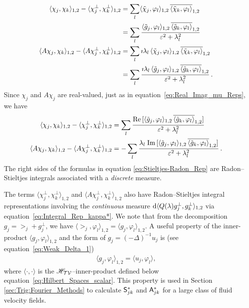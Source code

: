 \documentclass[amsa]{ipart}
\begin{document}
%
\begin{align}\label{eq:Stieltjes-Radon_Pre}
  \langle\chi_j,\chi_k\rangle_{1,2}-\langle\chi_j^\perp,\chi_k^\perp\rangle_{1,2}&=\sum_l\langle\chit_j,\varphi_l\rangle_{1,2}\,\overline{\langle\chit_k,\varphi_l\rangle}_{1,2}
         \\\notag
         &=\sum_l\frac{\langle\gt_j,\varphi_l\rangle_{1,2}\,\overline{\langle\gt_k,\varphi_l\rangle}_{1,2}}{\varepsilon^2+\lambda_l^2}
         \\\notag
  \langle A\chi_j,\chi_k\rangle_{1,2}-\langle A\chi_j^\perp,\chi_k^\perp\rangle_{1,2}&=\sum_l\imath\lambda_l\,\langle\chit_j,\varphi_l\rangle_{1,2}\,\overline{\langle\chit_k,\varphi_l\rangle}_{1,2}
         \\\notag
         &=\sum_l\frac{\imath\lambda_l\,\langle\gt_j,\varphi_l\rangle_{1,2}\,\overline{\langle\gt_k,\varphi_l\rangle}_{1,2}}{\varepsilon^2+\lambda_l^2}\,.
         \notag
\end{align}
%
Since $\chi_j$ and $A\chi_j$ are real-valued, just as in
equation~\eqref{eq:Real_Imag_mu_Reps}, we have 
%
\begin{align}\label{eq:Stieltjes-Radon_Rep}
  \langle\chi_j,\chi_k\rangle_{1,2}-\langle\chi_j^\perp,\chi_k^\perp\rangle_{1,2}
  &=\sum_l\frac{\Real[\langle\gt_j,\varphi_l\rangle_{1,2}\,\overline{\langle\gt_k,\varphi_l\rangle}_{1,2}]}{\varepsilon^2+\lambda_l^2}
         \\
  \langle A\chi_j,\chi_k\rangle_{1,2}-\langle A\chi_j^\perp,\chi_k^\perp\rangle_{1,2}
  &=-\sum_l\frac{\lambda_l\;\Imag[\langle\gt_j,\varphi_l\rangle_{1,2}\,\overline{\langle\gt_k,\varphi_l\rangle}_{1,2}]}{\varepsilon^2+\lambda_l^2}\,.
         \notag
\end{align}
%
The right sides of the formulas in equation
\eqref{eq:Stieltjes-Radon_Rep} are Radon--Stieltjes integrals
associated with a \emph{discrete} measure. 




The terms $\langle\chi_j^\perp,\chi_k^\perp\rangle_{1,2}$ and
$\langle A\chi_j^\perp,\chi_k^\perp\rangle_{1,2}$ also have Radon--Stieltjes integral representations
involving the \emph{continuous} measure $\mathrm{d}\langle Q(\lambda)g_j^\perp,g_k^\perp\rangle_{1,2}$
via equation~\eqref{eq:Integral_Rep_kappa*}. We note that from the 
decomposition $g_j=\gt_j+g^\perp_j$, we have
$\langle\gt_j,\varphi_l\rangle_{1,2}=\langle g_j,\varphi_l\rangle_{1,2}$. A useful property of the inner-product
$\langle g_j,\varphi_l\rangle_{1,2}$ and the form of $g_j=(-\Delta)^{-1}u_j$ is (see
equation~\eqref{eq:Weak_Delta_1}) 
%
\begin{align}\label{eq:H1_L2}
  \langle g_j,\varphi_l\rangle_{1,2}=\langle u_j,\varphi_l\rangle,
\end{align}
%
where $\langle\cdot,\cdot\rangle$ is the $\mathscr{H}_{\mathcal{T}\mathcal{V}}$--inner-product defined below
equation~\eqref{eq:Hilbert_Spaces_scalar}. 
This property is used in Section \ref{sec:Trig:Fourier_Methods} to
calculate $\mathsf{S}^*_{jk}$ and $\mathsf{A}^*_{jk}$ for a large class of fluid
velocity fields.    
\end{document}
